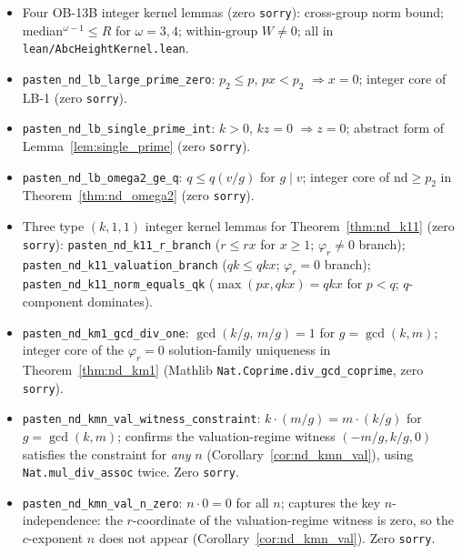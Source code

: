 \documentclass[12pt]{article}
\theoremstyle{definition}
\begin{document}
\begin{itemize}
    if $f = 0$ on $P_b$ and $f = 0$ on $P_c$, then $\sum_{P_b} f = \sum_{P_a} f$
    (degenerate condition for all $\omega$; Lean, zero \texttt{sorry}).
    This is the first fully general-$\omega$ Lean formalization in this project.
  \item Four OB-13B integer kernel lemmas (zero \texttt{sorry}):
    cross-group norm bound; median$^{\omega-1} \le R$ for $\omega=3,4$;
    within-group $W \ne 0$; all in \texttt{lean/AbcHeightKernel.lean}.
  \item \texttt{pasten\_nd\_lb\_large\_prime\_zero}: $p_2 \le p$, $p x < p_2$
    $\Rightarrow x = 0$; integer core of LB-1 (zero \texttt{sorry}).
  \item \texttt{pasten\_nd\_lb\_single\_prime\_int}: $k > 0$, $kz = 0$
    $\Rightarrow z = 0$; abstract form of Lemma~\ref{lem:single_prime}
    (zero \texttt{sorry}).
  \item \texttt{pasten\_nd\_lb\_omega2\_ge\_q}: $q \le q (v/g)$ for $g \mid v$;
    integer core of $\mathrm{nd} \ge p_2$ in Theorem~\ref{thm:nd_omega2}
    (zero \texttt{sorry}).
  \item Three type $(k,1,1)$ integer kernel lemmas for Theorem~\ref{thm:nd_k11}
    (zero \texttt{sorry}):
    {\footnotesize\texttt{pasten\_nd\_k11\_r\_branch}} ($r \le rx$ for $x \ge 1$;
    $\varphi_r \ne 0$ branch);
    {\footnotesize\texttt{pasten\_nd\_k11\_valuation\_branch}} ($qk \le qkx$;
    $\varphi_r{=}0$ branch);
    {\footnotesize\texttt{pasten\_nd\_k11\_norm\_equals\_qk}} ($\max(px, qkx) = qkx$
    for $p < q$; $q$-component dominates).
  \item \texttt{pasten\_nd\_km1\_gcd\_div\_one}: $\gcd(k/g,\, m/g) = 1$ for
    $g = \gcd(k,m)$; integer core of the $\varphi_r{=}0$ solution-family
    uniqueness in Theorem~\ref{thm:nd_km1} (Mathlib
    \texttt{Nat.Coprime.div\_gcd\_coprime}, zero \texttt{sorry}).
  \item \texttt{pasten\_nd\_kmn\_val\_witness\_constraint}:
    $k \cdot (m/g) = m \cdot (k/g)$ for $g = \gcd(k,m)$; confirms the
    valuation-regime witness $(-m/g, k/g, 0)$ satisfies the constraint for
    \emph{any} $n$ (Corollary~\ref{cor:nd_kmn_val}), using
    \texttt{Nat.mul\_div\_assoc} twice.  Zero \texttt{sorry}.
  \item \texttt{pasten\_nd\_kmn\_val\_n\_zero}: $n \cdot 0 = 0$ for all $n$;
    captures the key $n$-independence: the $r$-coordinate of the
    valuation-regime witness is zero, so the $c$-exponent $n$ does not appear
    (Corollary~\ref{cor:nd_kmn_val}).  Zero \texttt{sorry}.
\end{itemize}
\end{document}
